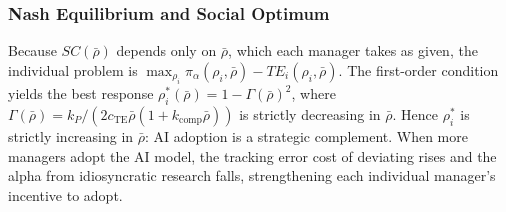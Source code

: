 \subsubsection{Nash Equilibrium and Social Optimum}

Because $SC(\bar{\rho})$ depends only on $\bar{\rho}$, which each manager takes as given, the individual problem is $\max_{\rho_i} \pi_\alpha(\rho_i, \bar{\rho}) - TE_i(\rho_i, \bar{\rho})$. The first-order condition yields the best response $\rho_i^*(\bar{\rho}) = 1 - \Gamma(\bar{\rho})^2$, where $\Gamma(\bar{\rho}) = k_P / (2 c_{\text{TE}} \bar{\rho}(1+k_{\text{comp}} \bar{\rho}))$ is strictly decreasing in $\bar{\rho}$. Hence $\rho_i^*$ is strictly increasing in $\bar{\rho}$: AI adoption is a strategic complement. When more managers adopt the AI model, the tracking error cost of deviating rises and the alpha from idiosyncratic research falls, strengthening each individual manager's incentive to adopt.

